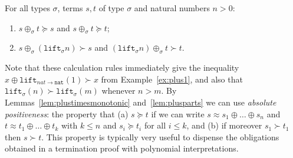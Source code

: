 \documentclass[a4paper,UKenglish,cleveref,autoref,numberwithinsect]{lipics-v2019}
\theoremstyle{definition}
\newcommand{\arrtype}{\rightarrow}
\newcommand{\nat}{\mathtt{nat}}
\newcommand{\lift}{\mathtt{lift}}
\begin{document}
\begin{lemma}\label{lem:plusparts}
For all types $\sigma$, terms $s,t$ of type $\sigma$ and natural
numbers $n > 0$:
\begin{enumerate}
\item\label{lem:plusparts:removefromsucceq}
  $s \oplus_{\sigma} t \succeq s$ and $s \oplus_{\sigma} t \succeq
  t$;
\item $s \oplus_{\sigma} (\lift_{\sigma} n) \succ s$ and
  $(\lift_{\sigma} n) \oplus_{\sigma} t \succ t$.
\end{enumerate}
\end{lemma}

Note that these calculation rules immediately give the
inequality $x \oplus \lift_{nat \arrtype \nat}(1) \succ x$ from
Example~\ref{ex:plus1}, and also that $\lift_\sigma(n) \succ
\lift_\sigma(m)$ whenever $n > m$.  By
Lemmas~\ref{lem:plustimesmonotonic} and~\ref{lem:plusparts} we
can use \emph{absolute positiveness}: the property that
(a) $s \succeq t$ if we can write $s \approx s_1 \oplus \dots \oplus
s_n$ and $t \approx t_1 \oplus \dots \oplus t_k$ with $k \leq n$ and
$s_i \succeq t_i$ for all $i \leq k$, and (b) if moreover $s_1 \succ
t_1$ then $s \succ t$. This property is typically very
useful to dispense the obligations obtained in a termination proof with
polynomial interpretations.
\end{document}
